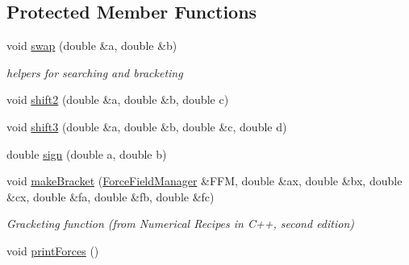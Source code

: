 \subsection*{Protected Member Functions}
\begin{DoxyCompactItemize}
\item 
void \hyperlink{classCGMethod_a98910fcbef9f0af69076c955b887c254}{swap} (double \&a, double \&b)
\begin{DoxyCompactList}\small\item\em helpers for searching and bracketing \end{DoxyCompactList}\item 
void \hyperlink{classCGMethod_ac091059dd8c44e8e4ec372767f18f1c9}{shift2} (double \&a, double \&b, double c)
\item 
void \hyperlink{classCGMethod_a947d6e38d75fe84a08f0fc071c94c225}{shift3} (double \&a, double \&b, double \&c, double d)
\item 
double \hyperlink{classCGMethod_aea6d1129677d44e11fe2afb08b5ca52c}{sign} (double a, double b)
\item 
void \hyperlink{classCGMethod_a276c57252367bec9fcf08ae1e7c7df71}{make\+Bracket} (\hyperlink{classForceFieldManager}{Force\+Field\+Manager} \&F\+F\+M, double \&ax, double \&bx, double \&cx, double \&fa, double \&fb, double \&fc)
\begin{DoxyCompactList}\small\item\em Gracketing function (from Numerical Recipes in C++, second edition) \end{DoxyCompactList}\item 
void \hyperlink{classCGMethod_abd5135fdbe89793bfb5926f9dcc6de7e}{print\+Forces} ()
\end{DoxyCompactItemize}
{\bf }\par
